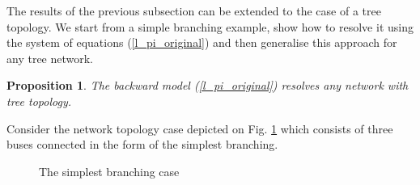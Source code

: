 \documentclass[journal,10pt,onecolumn,draftclsnofoot,]{IEEEtran}
\makeatletter
\theoremstyle{plain}
\newtheorem{proposition}{Proposition}
\theoremstyle{definition}
\theoremstyle{remark}
\renewenvironment{proof}[1][\proofname]{\par
  \pushQED{\qed}%
  \normalfont \topsep6\p@\@plus6\p@\relax
  \list{}{%
    \settowidth{\leftmargin}{\itshape\proofname:\hskip\labelsep}%
    \setlength{\labelwidth}{0pt}%
    \setlength{\itemindent}{-\leftmargin}%
  }%
  \item[\hskip\labelsep\itshape#1\@addpunct{:}]\ignorespaces
}{%
  \popQED\endlist\@endpefalse
}
\makeatother
\begin{document}
The results of the previous subsection can be extended to the case of a tree topology. We start from a simple branching example, show how to resolve it using the system of equations (\ref{l_pi_original}) and then generalise this approach for any tree network.
\begin{proposition}
  The backward model (\ref{l_pi_original}) resolves any network with tree topology.
\end{proposition}{}
\begin{proof}[Proof (Outline)]
  Consider the network topology case depicted on Fig. \ref{f2} which consists of three buses{} connected in the form of the simplest branching.
  \begin{figure}[H]
  \centering
  \caption{The simplest branching case}
  \label{f2}
  \end{figure}

\end{proof}
\end{document}
